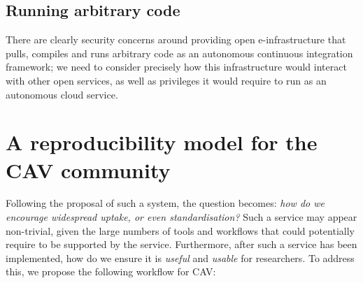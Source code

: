 \documentclass[conference]{IEEEtran}
\begin{document}
\subsection{Running arbitrary code}

There are clearly security concerns around providing open
e-infrastructure that pulls, compiles and runs arbitrary
code as an autonomous continuous integration framework; we need to
consider precisely how this infrastructure would interact with other
open services, as well as privileges it would require to run as an
autonomous cloud service.


\section{A reproducibility model for the CAV community}\label{rollout}

Following the proposal of such a system, the question becomes:
{\emph{how do we encourage widespread uptake, or even standardisation?}}
Such a service may appear non-trivial, given the large numbers of
tools and workflows
that could potentially require to be supported by the service. Furthermore,
after such a service has been implemented, how do we ensure it is
\emph{useful} and \emph{usable} for researchers. To address this, we
propose the following workflow for CAV:
\end{document}
